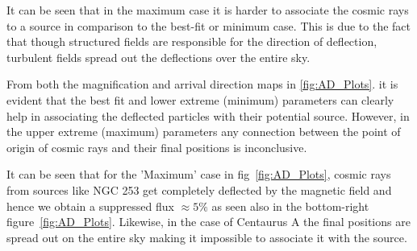 \documentclass[usenatbib]{mnras}
\newcommand{\Andrew}[1]{\textcolor{dg}{#1}}
\newcommand{\Arjen}[1]{{\color{brown}#1}}
\newcommand{\Vasu}[1]{{\color{purple}#1}}
\begin{document}
\begin{enumerate}
\begin{enumerate}
    \end{enumerate}

    It can be seen that in the maximum case it is harder to associate the cosmic rays to a source in comparison to the best-fit or minimum case. This is due to the fact that though structured fields are responsible for the direction of deflection, turbulent fields spread out the deflections over the entire sky.
   
    \end{enumerate}
    
From both the magnification and arrival direction maps in \ref{fig:AD_Plots}. it is evident that the best fit and lower extreme (minimum) parameters can clearly help in associating the deflected particles with their potential source. However, in the upper extreme (maximum) parameters any connection between the point of origin of cosmic rays and their final positions is inconclusive. 


It can be seen that for the 'Maximum' case in fig~\ref{fig:AD_Plots}, cosmic rays from sources like NGC 253 get completely deflected by the magnetic field and hence we obtain a suppressed flux $\approx 5\%$ as seen also in the bottom-right figure~\ref{fig:AD_Plots}. Likewise, in the case of Centaurus A the final positions are spread out on the entire sky making it impossible to associate it with the source.
\end{document}
